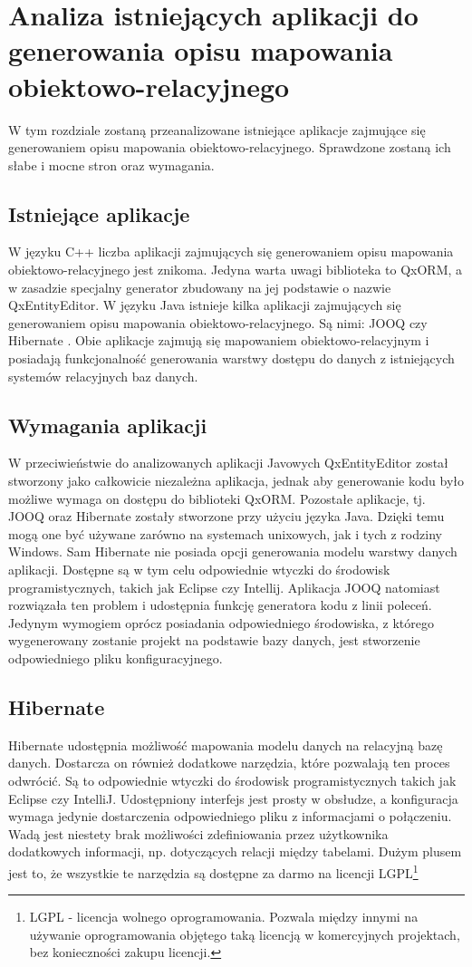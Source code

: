 \documentclass[12pt]{report}
\begin{document}
\chapter{Analiza istniejących aplikacji do generowania opisu mapowania obiektowo-relacyjnego}\label{chap:analiza}
W tym rozdziale zostaną przeanalizowane istniejące aplikacje zajmujące się generowaniem opisu mapowania obiektowo-relacyjnego. Sprawdzone zostaną ich słabe i mocne stron oraz wymagania.
\section{Istniejące aplikacje}
\indent W języku C++ liczba aplikacji zajmujących się generowaniem opisu mapowania obiektowo-relacyjnego jest znikoma. Jedyna warta uwagi biblioteka to QxORM, a w zasadzie specjalny generator zbudowany na jej podstawie o nazwie QxEntityEditor. W języku Java istnieje kilka aplikacji zajmujących się generowaniem opisu mapowania obiektowo-relacyjnego. Są nimi: JOOQ \cite{jooqweb} czy Hibernate \cite{hibernateweb}. Obie aplikacje zajmują się mapowaniem obiektowo-relacyjnym i posiadają funkcjonalność generowania warstwy dostępu do danych z istniejących systemów relacyjnych baz danych.
\section{Wymagania aplikacji}
W przeciwieństwie do analizowanych aplikacji Javowych QxEntityEditor został stworzony jako całkowicie niezależna aplikacja, jednak aby generowanie kodu było możliwe wymaga on dostępu do biblioteki QxORM. Pozostałe aplikacje, tj. JOOQ oraz Hibernate zostały stworzone przy użyciu języka Java. Dzięki temu mogą one być używane zarówno na systemach unixowych, jak i tych z rodziny Windows. Sam Hibernate nie posiada opcji generowania modelu warstwy danych aplikacji. Dostępne są w tym celu odpowiednie wtyczki do środowisk programistycznych, takich jak Eclipse czy Intellij. Aplikacja JOOQ natomiast rozwiązała ten problem i udostępnia funkcję generatora kodu z linii poleceń.
Jedynym wymogiem oprócz posiadania odpowiedniego środowiska, z którego wygenerowany zostanie projekt na podstawie bazy danych, jest stworzenie odpowiedniego pliku konfiguracyjnego.

\section{Hibernate}
Hibernate udostępnia możliwość mapowania modelu danych na relacyjną bazę danych. Dostarcza on również dodatkowe narzędzia, które pozwalają ten proces odwrócić. Są to odpowiednie wtyczki do środowisk programistycznych takich jak Eclipse czy IntelliJ. Udostępniony interfejs jest prosty w obsłudze, a konfiguracja wymaga jedynie dostarczenia odpowiedniego pliku z informacjami o połączeniu. Wadą jest niestety brak możliwości zdefiniowania przez użytkownika dodatkowych informacji, np. dotyczących relacji między tabelami. Dużym plusem jest to, że wszystkie te narzędzia są dostępne za darmo na licencji LGPL\footnote{LGPL - licencja wolnego oprogramowania. Pozwala między innymi na używanie oprogramowania objętego taką licencją w komercyjnych projektach, bez konieczności zakupu licencji.}
\end{document}
